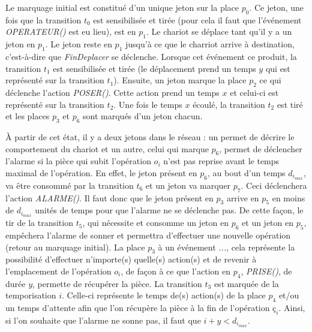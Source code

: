 Le marquage initial est constitué d'un unique jeton sur la place $p_0$. Ce jeton, une fois que la transition $t_0$ est sensibilisée et tirée (pour cela il faut que l'événement \emph{OPERATEUR()} est eu lieu), est en $p_1$. Le chariot se déplace tant qu'il y a un jeton en $p_1$. Le jeton reste en $p_1$ jusqu'à ce que le charriot arrive à destination, c'est-à-dire que \emph{FinDeplacer} se déclenche. Lorsque cet événement ce produit, la transition $t_1$ est sensibilisée et tirée (le déplacement prend un temps $y$ qui est représenté sur la transition $t_1$). Ensuite, un jeton marque la place $p_2$ ce qui déclenche l'action \emph{POSER()}. Cette action prend un temps $x$ et celui-ci est représenté sur la transition $t_2$. Une fois le temps $x$ écoulé, la transition $t_2$ est tiré et les places $p_3$ et $p_6$ sont marqués d'un jeton chacun. 

À partir de cet état, il y a deux jetons dans le réseau : un permet de décrire le comportement du chariot et un autre, celui qui marque $p_6$, permet de déclencher l'alarme si la pièce qui subit l'opération $o_i$ n'est pas reprise avant le temps maximal de l'opération.  En effet, le jeton présent en $p_6$, au bout d'un temps $d_{i_{max}}$, va être consommé par la transition $t_6$ et un jeton va marquer $p_7$. Ceci déclenchera l'action \emph{ALARME()}.
Il faut donc que le jeton présent en $p_3$ arrive en $p_5$ en moins de $d_{i_{max}}$ unités de temps pour que l'alarme ne se déclenche pas. De cette façon, le tir de la transition $t_5$, qui nécessite et consomme un jeton en $p_6$ et un jeton en $p_5$, empêchera l'alarme de sonner et permettra d'effectuer une nouvelle opération (retour au marquage initial). 
La place $p_3$ à un événement \emph{...}, cela représente la possibilité d'effectuer n'importe(s) quelle(s) action(s) et de revenir à l'emplacement de l'opération $o_i$, de façon à ce que l'action en $p_4$, \emph{PRISE()}, de durée $y$, permette de récupérer la pièce. La transition $t_3$ est marquée de la temporisation $i$. Celle-ci représente le temps de(s) action(s) de la place $p_4$ et/ou un temps d'attente afin que l'on récupère la pièce à la fin de l'opération $ç_i$. Ainsi, si l'on souhaite que l'alarme ne sonne pas, il faut que $i + y < d_{i_{max}}$.

